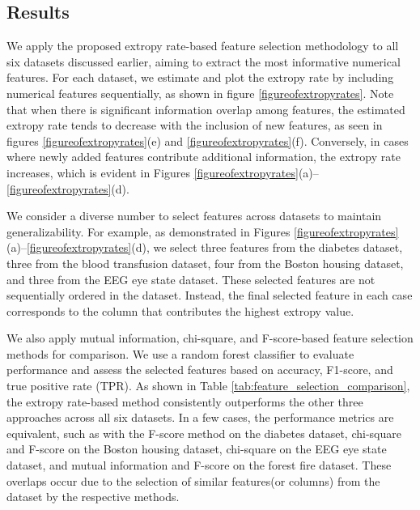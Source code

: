\documentclass[pdflatex]{sn-jnl}%
\theoremstyle{thmstyleone}
\theoremstyle{thmstyletwo}%
\theoremstyle{thmstylethree}%
\begin{document}
\subsection{Results}
We apply the proposed extropy rate-based feature selection methodology to all six datasets discussed earlier, aiming to extract the most informative numerical features. For each dataset, we estimate and plot the extropy rate by including numerical features sequentially, as shown in figure \ref{figureofextropyrates}. Note that when there is significant information overlap among features, the estimated extropy rate tends to decrease with the inclusion of new features, as seen in figures \ref{figureofextropyrates}(e) and \ref{figureofextropyrates}(f). Conversely, in cases where newly added features contribute additional information, the extropy rate increases, which is evident in Figures \ref{figureofextropyrates}(a)–\ref{figureofextropyrates}(d).

We consider a diverse number to select features across datasets to maintain generalizability. For example, as demonstrated in Figures \ref{figureofextropyrates}(a)–\ref{figureofextropyrates}(d), we select three features from the diabetes dataset, three from the blood transfusion dataset, four from the Boston housing dataset, and three from the EEG eye state dataset. These selected features are not sequentially ordered in the dataset. Instead, the final selected feature in each case corresponds to the column that contributes the highest extropy value.

We also apply mutual information, chi-square, and F-score-based feature selection methods for comparison. We use a random forest classifier to evaluate performance and assess the selected features based on accuracy, F1-score, and true positive rate (TPR). As shown in Table \ref{tab:feature_selection_comparison}, the extropy rate-based method consistently outperforms the other three approaches across all six datasets. In a few cases, the performance metrics are equivalent, such as with the F-score method on the diabetes dataset, chi-square and F-score on the Boston housing dataset, chi-square on the EEG eye state dataset, and mutual information and F-score on the forest fire dataset. These overlaps occur due to the selection of similar features(or columns) from the dataset by the respective methods.
\end{document}
